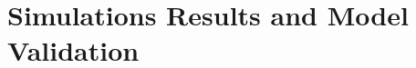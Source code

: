 
\chapter[Simulations Results and Model Validation]{Simulations Results and Model Validation}
\label{ch:validation}







